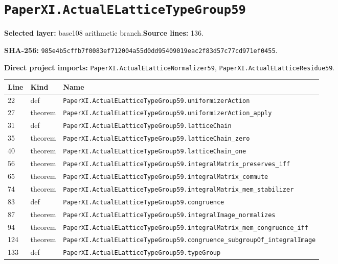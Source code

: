 \documentclass[10pt,oneside]{book}
\begin{document}
\section{\texorpdfstring{\nolinkurl{PaperXI.ActualELatticeTypeGroup59}}{PaperXI.ActualELatticeTypeGroup59}}\label{module:PaperXI.ActualELatticeTypeGroup59}

\textbf{Selected layer:} base108 arithmetic branch.\quad\textbf{Source lines:} 136.\par\textbf{SHA-256:} {\scriptsize\nolinkurl{985e4b5cffb7f0083ef712004a55d0dd95409019eac2f83d57c77cd971ef0455}}.


\textbf{Direct project imports:} \nolinkurl{PaperXI.ActualELatticeNormalizer59}, \nolinkurl{PaperXI.ActualELatticeResidue59}.

\begin{longtable}{@{}p{}p{}p{}@{}}\toprule Line&Kind&Name\\\midrule\endhead

22&def&\nolinkurl{PaperXI.ActualELatticeTypeGroup59.uniformizerAction}\\

27&theorem&\nolinkurl{PaperXI.ActualELatticeTypeGroup59.uniformizerAction_apply}\\

31&def&\nolinkurl{PaperXI.ActualELatticeTypeGroup59.latticeChain}\\

35&theorem&\nolinkurl{PaperXI.ActualELatticeTypeGroup59.latticeChain_zero}\\

40&theorem&\nolinkurl{PaperXI.ActualELatticeTypeGroup59.latticeChain_one}\\

56&theorem&\nolinkurl{PaperXI.ActualELatticeTypeGroup59.integralMatrix_preserves_iff}\\

65&theorem&\nolinkurl{PaperXI.ActualELatticeTypeGroup59.integralMatrix_commute}\\

74&theorem&\nolinkurl{PaperXI.ActualELatticeTypeGroup59.integralMatrix_mem_stabilizer}\\

83&def&\nolinkurl{PaperXI.ActualELatticeTypeGroup59.congruence}\\

87&theorem&\nolinkurl{PaperXI.ActualELatticeTypeGroup59.integralImage_normalizes}\\

94&theorem&\nolinkurl{PaperXI.ActualELatticeTypeGroup59.integralMatrix_mem_congruence_iff}\\

124&theorem&\nolinkurl{PaperXI.ActualELatticeTypeGroup59.congruence_subgroupOf_integralImage}\\

133&def&\nolinkurl{PaperXI.ActualELatticeTypeGroup59.typeGroup}\\

\bottomrule\end{longtable}
\end{document}
